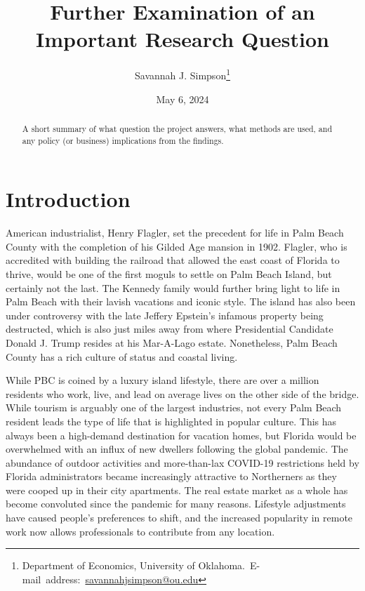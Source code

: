 \documentclass[12pt,english]{article}
\begin{document}
\begin{singlespace}
\title{Further Examination of an Important Research Question}
\end{singlespace}

\author{Savannah J. Simpson\thanks{Department of Economics, University of Oklahoma.\
E-mail~address:~\href{mailto:student.name@ou.edu}{savannahjsimpson@ou.edu}}}

\date{May 6, 2024}

\maketitle

\begin{abstract}
\begin{singlespace}
A short summary of what question the project answers, what methods are used, and any policy (or business) implications from the findings.
\end{singlespace}

\end{abstract}
\vfill{}


\pagebreak{}


\section{Introduction}\label{sec:intro}
\indent American industrialist, Henry Flagler, set the precedent for life in Palm Beach County with the completion of his Gilded Age mansion in 1902. Flagler, who is accredited with building the railroad that allowed the east coast of Florida to thrive, would be one of the first moguls to settle on Palm Beach Island, but certainly not the last. The Kennedy family would further bring light to life in Palm Beach with their lavish vacations and iconic style. The island has also been under controversy with the late Jeffery Epstein's infamous property being destructed, which is also just miles away from where Presidential Candidate Donald J. Trump resides at his Mar-A-Lago estate. Nonetheless, Palm Beach County has a rich culture of status and coastal living. 

While PBC is coined by a luxury island lifestyle, there are over a million residents who work, live, and lead on average lives on the other side of the bridge. While tourism is arguably one of the largest industries, not every Palm Beach resident leads the type of life that is highlighted in popular culture. This has always been a high-demand destination for vacation homes, but Florida would be overwhelmed with an influx of new dwellers following the global pandemic. The abundance of outdoor activities and more-than-lax COVID-19 restrictions held by Florida administrators became increasingly attractive to Northerners as they were cooped up in their city apartments. The real estate market as a whole has become convoluted since the pandemic for many reasons. Lifestyle adjustments have caused people's preferences to shift, and the increased popularity in remote work now allows professionals to contribute from any location. 
\end{document}
